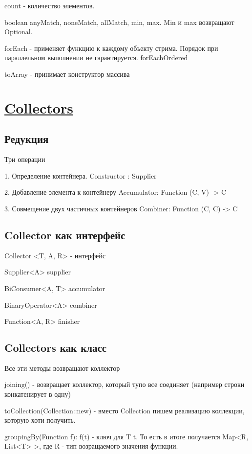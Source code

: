 \documentclass{article}
\begin{document}
count - количество элементов.

boolean anyMatch, noneMatch, allMatch, min, max. Min и max возвращают Optional.

forEach - применяет функцию к каждому объекту стрима. Порядок при параллельном выполнении не гарантируется. forEachOrdered

toArray - принимает конструктор массива

\section{\underline{Collectors}}

\subsection{Редукция}

Три операции

1. Определение контейнера. Constructor : Supplier

2. Добавление элемента к контейнеру Accumulator: Function (C, V) -> C

3. Совмещение двух частичных контейнеров Combiner: Function (C, C) -> C

\subsection{Collector как интерфейс}

Collector <T, A, R> - интерфейс

Supplier<A> supplier

BiConsumer<A, T> accumulator

BinaryOperator<A> combiner

Function<A, R> finisher

\subsection{Collectors как класс}

Все эти методы возвращают коллектор

joining() - возвращает коллектор, который тупо все соединяет (например строки конкатенирует в одну)

toCollection(Collection::new) - вместо Collection пишем реализацию коллекции, которую хоти получить.

groupingBy(Function f): f(t) - ключ для T t. То есть в итоге получается Map<R, List<T> >, где R - тип возращаемого значения функции.
\end{document}
